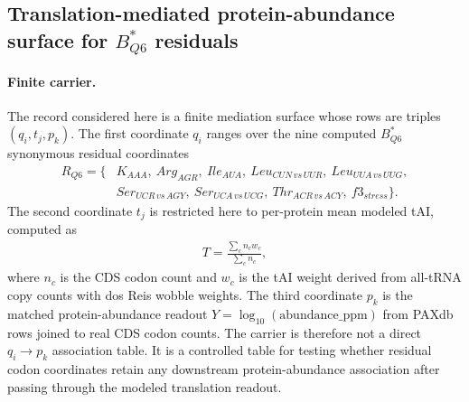 \subsection{Translation-mediated protein-abundance surface for $B^*_{Q6}$ residuals}\label{sec:q6-translation-mediated-protein-abundance-cross-layer}

\paragraph{Finite carrier.}
The record considered here is a finite mediation surface whose rows are triples $(q_i,t_j,p_k)$.  The first coordinate $q_i$ ranges over the nine computed $B^*_{Q6}$ synonymous residual coordinates
$$
\begin{aligned}
R_{Q6}=\{&K_{AAA},\ Arg_{AGR},\ Ile_{AUA},\ Leu_{CUN\,vs\,UUR},\ Leu_{UUA\,vs\,UUG},\\
&Ser_{UCR\,vs\,AGY},\ Ser_{UCA\,vs\,UCG},\ Thr_{ACR\,vs\,ACY},\ f3_{stress}\}.
\end{aligned}
$$
The second coordinate $t_j$ is restricted here to per-protein mean modeled tAI, computed as
$$
\begin{aligned}
T=\frac{\sum_c n_c w_c}{\sum_c n_c},
\end{aligned}
$$
where $n_c$ is the CDS codon count and $w_c$ is the tAI weight derived from all-tRNA copy counts with dos Reis wobble weights.  The third coordinate $p_k$ is the matched protein-abundance readout $Y=\log_{10}(\mathrm{abundance\_ppm})$ from PAXdb rows joined to real CDS codon counts.  The carrier is therefore not a direct $q_i\to p_k$ association table.  It is a controlled table for testing whether residual codon coordinates retain any downstream protein-abundance association after passing through the modeled translation readout.

